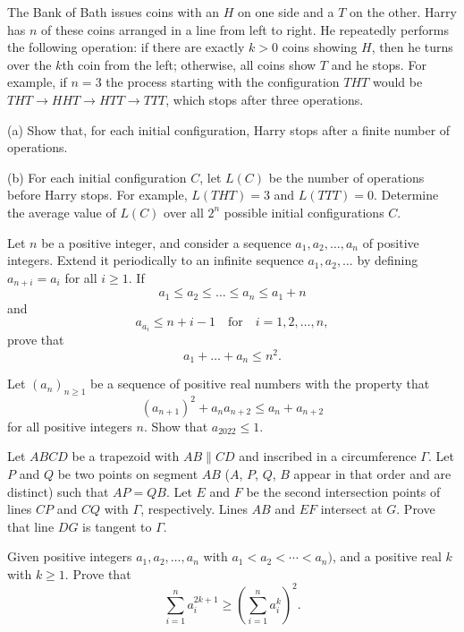\documentclass[11pt]{scrartcl}
\begin{document}
\begin{problem}[623590906176957]
	The Bank of Bath issues coins with an $H$ on one side and a $T$ on the other. Harry has $n$ of these coins arranged in a line from left to right. He repeatedly performs the following operation: if there are exactly $k>0$ coins showing $H$, then he turns over the $k$th coin from the left; otherwise, all coins show $T$ and he stops. For example, if $n=3$ the process starting with the configuration $THT$ would be $THT \to HHT  \to HTT \to TTT$, which stops after three operations.

(a) Show that, for each initial configuration, Harry stops after a finite number of operations.

(b) For each initial configuration $C$, let $L(C)$ be the number of operations before Harry stops. For example, $L(THT) = 3$ and $L(TTT) = 0$. Determine the average value of $L(C)$ over all $2^n$ possible initial configurations $C$.
\end{problem}
\begin{problem}[629259075127282]
Let $n$ be a positive integer, and consider a sequence $a_1 , a_2 , \dotsc , a_n $ of positive integers. Extend it periodically to an infinite sequence $a_1 , a_2 , \dotsc $ by defining $a_{n+i} = a_i $ for all $i \ge 1$. If\[a_1 \le a_2 \le \dots \le a_n \le a_1 +n  \]and\[a_{a_i } \le n+i-1 \quad\text{for}\quad i=1,2,\dotsc, n, \]prove that\[a_1 + \dots +a_n \le n^2. \]
\end{problem}
\begin{problem}[633974672407561]
Let $(a_n)_{n\geq 1}$ be a sequence of positive real numbers with the property that
$$(a_{n+1})^2 + a_na_{n+2} \leq a_n + a_{n+2}$$for all positive integers $n$. Show that $a_{2022}\leq 1$.
\end{problem}
\begin{problem}[634298954927697]
Let $ABCD$ be a trapezoid with $AB\parallel CD$ and inscribed in a circumference $\Gamma$. Let $P$ and $Q$ be two points on segment $AB$ ($A$, $P$, $Q$, $B$ appear in that order and are distinct) such that $AP=QB$. Let $E$ and $F$ be the second intersection points of lines $CP$ and $CQ$ with $\Gamma$, respectively. Lines $AB$ and $EF$ intersect at $G$. Prove that line $DG$ is tangent to $\Gamma$.
\end{problem}
\begin{problem}[636169073536678]
Given positive integers $a_1,a_2,\ldots, a_n$ with $a_1<a_2<\cdots<a_n)$, and a positive real $k$ with $k\geq 1$. Prove that
\[\sum_{i=1}^{n}a_i^{2k+1}\geq \left(\sum_{i=1}^{n}a_i^k\right)^2.\]
\end{problem}
\end{document}
